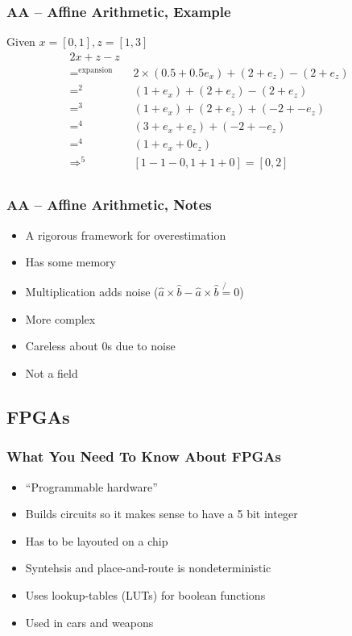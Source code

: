 \documentclass{beamer}
\newcommand{\say}[1]{``#1''}
\begin{document}
\begin{frame}
\frametitle{AA -- Affine Arithmetic, Example}

Given $x = [0, 1], z = [1, 3]$
\begin{align*}
    2x + z - z \\
    =^{\text{expansion}} \quad & 2 \times (0.5 + 0.5e_x) + (2 + e_z) - (2 + e_z) \\
    =^{2} \quad & (1 + e_x) + (2 + e_z) - (2 + e_z) \\
    =^{3} \quad & (1 + e_x) + (2 + e_z) + (-2 + -e_z) \\
    =^{4} \quad & (3 + e_x + e_z) + (-2 + -e_z) \\
    =^{4} \quad & (1 + e_x + 0e_z) \\
    \Rightarrow^{5} \quad & [1 - 1 - 0, 1 + 1 + 0] = [0, 2]\\
\end{align*}
\end{frame}

\begin{frame}
\frametitle{AA -- Affine Arithmetic, Notes}

\begin{itemize}
  \item A rigorous framework for overestimation
  \item Has some memory
  \item Multiplication adds noise ($\hat{a}\times\hat{b} - \hat{a}\times\hat{b} \not{=} 0$)
  \item More complex
  \item Careless about 0s due to noise
  \item Not a field
\end{itemize}
\end{frame}

\subsection{FPGAs}
\begin{frame}
\frametitle{What You Need To Know About FPGAs}

\begin{itemize}
  \item \say{Programmable hardware}
  \item Builds circuits so it makes sense to have a 5 bit integer
  \item Has to be layouted on a chip
  \item Syntehsis and place-and-route is nondeterministic
  \item Uses lookup-tables (LUTs) for boolean functions
  \item Used in cars and weapons 
\end{itemize}
\end{frame}
\end{document}
